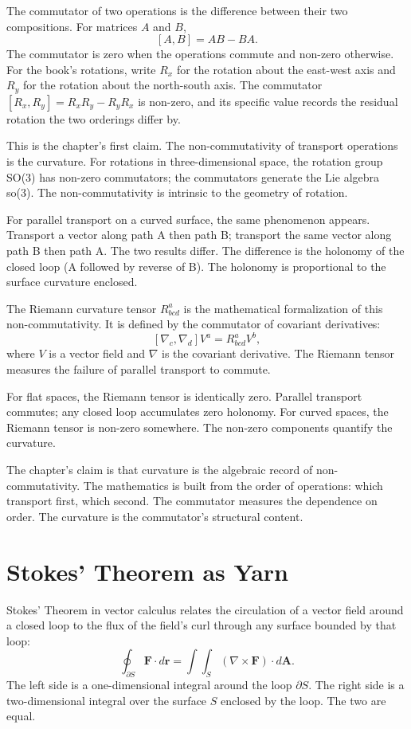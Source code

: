 The commutator of two operations is the difference between their
two compositions. For matrices $A$ and $B$,
\[
[A, B] = AB - BA.
\]
The commutator is zero when the operations commute and non-zero
otherwise. For the book's rotations, write $R_x$ for the rotation
about the east-west axis and $R_y$ for the rotation about the
north-south axis. The commutator $[R_x, R_y] = R_x R_y - R_y R_x$
is non-zero, and its specific value records the residual rotation
the two orderings differ by.

This is the chapter's first claim. The non-commutativity of
transport operations is the curvature. For rotations in
three-dimensional space, the rotation group SO(3) has non-zero
commutators; the commutators generate the Lie algebra so(3).
The non-commutativity is intrinsic to the geometry of rotation.

For parallel transport on a curved surface, the same phenomenon
appears. Transport a vector along path A then path B; transport
the same vector along path B then path A. The two results
differ. The difference is the holonomy of the closed loop
(A followed by reverse of B). The holonomy is proportional to
the surface curvature enclosed.

The Riemann curvature tensor $R^a_{bcd}$ is the mathematical
formalization of this non-commutativity. It is defined by the
commutator of covariant derivatives:
\[
[\nabla_c, \nabla_d] V^a = R^a_{bcd} V^b,
\]
where $V$ is a vector field and $\nabla$ is the covariant
derivative. The Riemann tensor measures the failure of parallel
transport to commute.

For flat spaces, the Riemann tensor is identically zero. Parallel
transport commutes; any closed loop accumulates zero holonomy.
For curved spaces, the Riemann tensor is non-zero somewhere.
The non-zero components quantify the curvature.

The chapter's claim is that curvature is the algebraic record of
non-commutativity. The mathematics is built from the order of
operations: which transport first, which second. The
commutator measures the dependence on order. The curvature is
the commutator's structural content.

\section{Stokes' Theorem as Yarn}
\label{se:stokes-theorem-as-yarn}

Stokes' Theorem in vector calculus relates the circulation of a
vector field around a closed loop to the flux of the field's curl
through any surface bounded by that loop:
\[
\oint_{\partial S} \mathbf{F} \cdot d\mathbf{r} = \int\int_S
(\nabla \times \mathbf{F}) \cdot d\mathbf{A}.
\]
The left side is a one-dimensional integral around the loop $\partial
S$. The right side is a two-dimensional integral over the surface
$S$ enclosed by the loop. The two are equal.

